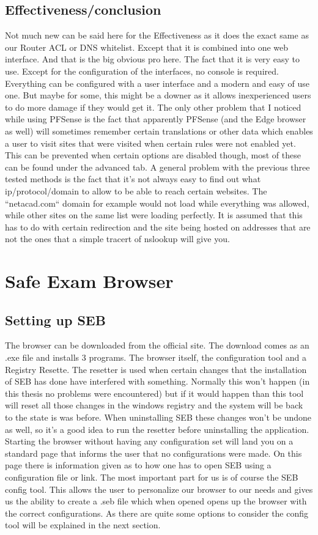\subsection{Effectiveness/conclusion}
Not much new can be said here for the Effectiveness as it does the exact same as our Router ACL or DNS whitelist. Except that it is combined into one web interface. And that is the big obvious pro here. The fact that it is very easy to use. Except for the configuration of the interfaces, no console is required. Everything can be configured with a user interface and a modern and easy of use one. But maybe for some, this might be a downer as it allows inexperienced users to do more damage if they would get it.
The only other problem that I noticed while using PFSense is the fact that apparently PFSense (and the Edge browser as well) will sometimes remember certain translations or other data which enables a user to visit sites that were visited when certain rules were not enabled yet. This can be prevented when certain options are disabled though, most of these can be found under the advanced tab. A general problem with the previous three tested methods is the fact that it's not always easy to find out what ip/protocol/domain to allow to be able to reach certain websites. The ``netacad.com`` domain for example would not load while everything was allowed, while other sites on the same list were loading perfectly. It is assumed that this has to do with certain redirection and the site being hosted on addresses that are not the ones that a simple tracert of nslookup will give you. 
\section{Safe Exam Browser}
\subsection{Setting up SEB}
The browser can be downloaded from the official site. The download comes as an .exe file and installs 3 programs. The browser itself, the configuration tool and a Registry Resette. The resetter is used when certain changes that the installation of SEB has done have interfered with something. Normally this won't happen (in this thesis no problems were encountered) but if it would happen than this tool will reset all those changes in the windows registry and the system will be back to the state is was before. When uninstalling SEB these changes won't be undone as well, so it's a good idea to run the resetter before uninstalling the application.\\
Starting the browser without having any configuration set will land you on a standard page that informs the user that no configurations were made. On this page there is information given as to how one has to open SEB using a configuration file or link.
The most important part for us is of course the SEB config tool. This allows the user to personalize our browser to our needs and gives us the ability to create a .seb file which when opened opens up the browser with the correct configurations. As there are quite some options to consider the config tool will be explained in the next section.
